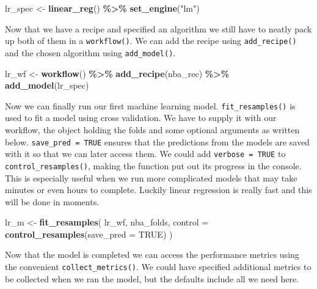\documentclass[
]{book}
\newenvironment{Shaded}{\begin{snugshade}}{\end{snugshade}}
\newcommand{\AttributeTok}[1]{\textcolor[rgb]{0.13,0.29,0.53}{#1}}
\newcommand{\ConstantTok}[1]{\textcolor[rgb]{0.56,0.35,0.01}{#1}}
\newcommand{\FunctionTok}[1]{\textcolor[rgb]{0.13,0.29,0.53}{\textbf{#1}}}
\newcommand{\NormalTok}[1]{#1}
\newcommand{\OtherTok}[1]{\textcolor[rgb]{0.56,0.35,0.01}{#1}}
\newcommand{\SpecialCharTok}[1]{\textcolor[rgb]{0.81,0.36,0.00}{\textbf{#1}}}
\newcommand{\StringTok}[1]{\textcolor[rgb]{0.31,0.60,0.02}{#1}}
\begin{document}
\begin{Shaded}
\begin{Highlighting}[]
\NormalTok{lr\_spec }\OtherTok{\textless{}{-}} \FunctionTok{linear\_reg}\NormalTok{() }\SpecialCharTok{\%\textgreater{}\%} 
  \FunctionTok{set\_engine}\NormalTok{(}\StringTok{"lm"}\NormalTok{)}
\end{Highlighting}
\end{Shaded}

Now that we have a recipe and specified an algorithm we still have to neatly
pack up both of them in a \texttt{workflow()}. We can add the recipe using
\texttt{add\_recipe()} and the chosen algorithm using \texttt{add\_model()}.

\begin{Shaded}
\begin{Highlighting}[]
\NormalTok{lr\_wf }\OtherTok{\textless{}{-}} \FunctionTok{workflow}\NormalTok{() }\SpecialCharTok{\%\textgreater{}\%} 
  \FunctionTok{add\_recipe}\NormalTok{(nba\_rec) }\SpecialCharTok{\%\textgreater{}\%} 
  \FunctionTok{add\_model}\NormalTok{(lr\_spec)}
\end{Highlighting}
\end{Shaded}

Now we can finally run our first machine learning model. \texttt{fit\_resamples()} is
used to fit a model using cross validation. We have to supply it with our
workflow, the object holding the folds and some optional arguments as written
below. \texttt{save\_pred\ =\ TRUE} ensures that the predictions from the models are saved
with it so that we can later access them. We could add \texttt{verbose\ =\ TRUE} to
\texttt{control\_resamples()}, making the function put out
its progress in the console. This is especially useful when we run more
complicated models that may take minutes or even hours to complete. Luckily
linear regression is really fast and this will be done in moments.

\begin{Shaded}
\begin{Highlighting}[]
\NormalTok{lr\_m }\OtherTok{\textless{}{-}} \FunctionTok{fit\_resamples}\NormalTok{(}
\NormalTok{  lr\_wf,}
\NormalTok{  nba\_folds,}
  \AttributeTok{control =} \FunctionTok{control\_resamples}\NormalTok{(}\AttributeTok{save\_pred =} \ConstantTok{TRUE}\NormalTok{)}
\NormalTok{)}
\end{Highlighting}
\end{Shaded}

Now that the model is completed we can access the performance metrics using the
convenient \texttt{collect\_metrics()}. We could have specified additional metrics to
be collected when we ran the model, but the defaults include all we need here.
\end{document}
